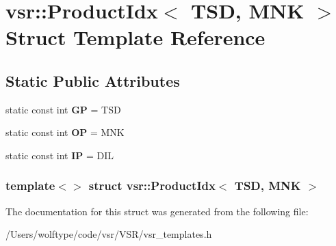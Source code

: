\hypertarget{structvsr_1_1_product_idx_3_01_t_s_d_00_01_m_n_k_01_4}{\section{vsr\-:\-:Product\-Idx$<$ T\-S\-D, M\-N\-K $>$ Struct Template Reference}
\label{structvsr_1_1_product_idx_3_01_t_s_d_00_01_m_n_k_01_4}
}
\subsection*{Static Public Attributes}
\begin{DoxyCompactItemize}
\item 
\hypertarget{structvsr_1_1_product_idx_3_01_t_s_d_00_01_m_n_k_01_4_a30ea3463b5763c5c212b9c9564d1d49d}{static const int {\bfseries G\-P} = T\-S\-D}\label{structvsr_1_1_product_idx_3_01_t_s_d_00_01_m_n_k_01_4_a30ea3463b5763c5c212b9c9564d1d49d}

\item 
\hypertarget{structvsr_1_1_product_idx_3_01_t_s_d_00_01_m_n_k_01_4_a95acfeac1d817214761dd8a15d6ef432}{static const int {\bfseries O\-P} = M\-N\-K}\label{structvsr_1_1_product_idx_3_01_t_s_d_00_01_m_n_k_01_4_a95acfeac1d817214761dd8a15d6ef432}

\item 
\hypertarget{structvsr_1_1_product_idx_3_01_t_s_d_00_01_m_n_k_01_4_a87c5552b388e3e72531a68522f48ffc3}{static const int {\bfseries I\-P} = D\-I\-L}\label{structvsr_1_1_product_idx_3_01_t_s_d_00_01_m_n_k_01_4_a87c5552b388e3e72531a68522f48ffc3}

\end{DoxyCompactItemize}
\subsubsection*{template$<$$>$ struct vsr\-::\-Product\-Idx$<$ T\-S\-D, M\-N\-K $>$}



The documentation for this struct was generated from the following file\-:\begin{DoxyCompactItemize}
\item 
/\-Users/wolftype/code/vsr/\-V\-S\-R/vsr\-\_\-templates.\-h\end{DoxyCompactItemize}
